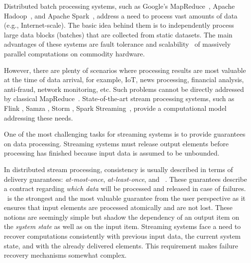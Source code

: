 
\label {fs-intro-seciton}

Distributed batch processing systems, such as Google's MapReduce~\cite{Dean:2008:MSD:1327452.1327492}, Apache Hadoop~\cite{hadoop2009hadoop}, and Apache Spark~\cite{Zaharia:2016:ASU:3013530.2934664}, address a need to process vast amounts of data (e.g., Internet-scale). 
The basic   idea behind them is to independently process large data blocks (batches) that are collected from static datasets. 
The main advantages of these systems are fault tolerance and scalability~\cite{borthakur2011apache} of massively parallel computations on commodity hardware.

However, there are plenty of scenarios where processing results are most valuable at the time of data arrival, for example, IoT, news processing, financial analysis, anti-fraud, network monitoring, etc. 
Such problems cannot be directly addressed by classical MapReduce~\cite{Doulkeridis:2014:SLA:2628707.2628782}. 
State-of-the-art stream processing systems, such as Flink \cite{carbone2015apache}, Samza \cite{Noghabi:2017:SSS:3137765.3137770}, Storm \cite{apache:storm}, Spark Streaming~\cite{Zaharia:2012:DSE:2342763.2342773},   provide a computational model addressing these needs.

One of the most challenging tasks for streaming systems is to provide guarantees on data processing. 
Streaming systems must release output elements before processing has finished because input data is assumed to be unbounded. 

In distributed stream processing, consistency is usually described in terms of delivery guarantees: {\em at-most-once}, {\em at-least-once}, and {\em \eo}~\cite{carbone2015apache}. 
These guarantees describe a contract regarding {\em which data} will be  processed and released in case of failures. 
\Eo\ is the strongest and the most valuable guarantee from the user perspective as it ensures that input elements are processed atomically and are not lost. These notions are seemingly simple but shadow  the dependency   of  an output item on the {\em system state} as well as on the  input item. 
Streaming systems face a need to recover computations consistently with previous input data, the current system state, and with the already delivered elements.
This requirement makes failure recovery mechanisms somewhat complex. 

